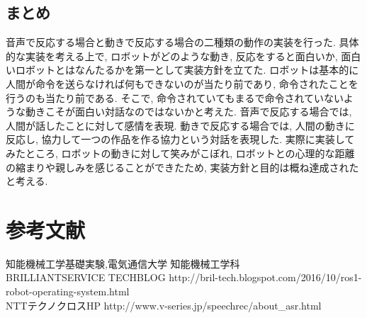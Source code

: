 \documentclass[a4paper,11pt,titlepage]{jsarticle}
\begin{document}
\subsection{まとめ}
音声で反応する場合と動きで反応する場合の二種類の動作の実装を行った. 具体的な実装を考える上で, ロボットがどのような動き,
反応をすると面白いか, 面白いロボットとはなんたるかを第一として実装方針を立てた. ロボットは基本的に人間が命令を送らなければ何もできないのが当たり前であり,
命令されたことを行うのも当たり前である. そこで, 命令されていてもまるで命令されていないような動きこそが面白い対話なのではないかと考えた.
音声で反応する場合では, 人間が話したことに対して感情を表現. 動きで反応する場合では, 人間の動きに反応し, 協力して一つの作品を作る協力という対話を表現した.
実際に実装してみたところ, ロボットの動きに対して笑みがこぼれ, ロボットとの心理的な距離の縮まりや親しみを感じることができたため, 実装方針と目的は概ね達成されたと考える.

\section{参考文献}
\noindent [1]知能機械工学基礎実験,電気通信大学  知能機械工学科 \\ \relax
[2]BRILLIANTSERVICE TECHBLOG http://bril-tech.blogspot.com/2016/10/ros1-robot-operating-system.html\\ \relax
[3]NTTテクノクロスHP http://www.v-series.jp/speechrec/about\_asr.html \\ \relax
\end{document}
